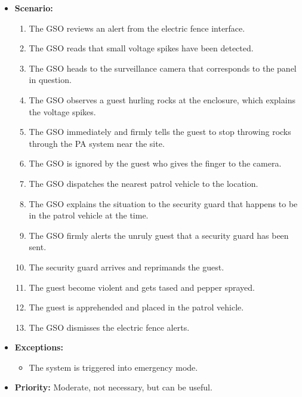 \documentclass[12pt]{article}
\begin{document}
\begin{itemize}
        \item[]\textbf{Scenario:}
            \begin{enumerate}
                \item The GSO reviews an alert from the electric fence interface.
                \item The GSO reads that small voltage spikes have been detected.
                \item The GSO heads to the surveillance camera that corresponds to the
                panel in question.
                \item The GSO observes a guest hurling rocks at the enclosure, which
                explains the voltage spikes.
                \item The GSO immediately and firmly tells the guest to stop throwing rocks
                through the PA system near the site.
                \item The GSO is ignored by the guest who gives the finger to the camera.
                \item The GSO dispatches the nearest patrol vehicle to the location.
                \item The GSO explains the situation to the security guard that happens 
                to be in the patrol vehicle at the time.
                \item The GSO firmly alerts the unruly guest that a security guard has been sent.
                \item The security guard arrives and reprimands the guest.
                \item The guest become violent and gets tased and pepper sprayed.
                \item The guest is apprehended and placed in the patrol vehicle.
                \item The GSO dismisses the electric fence alerts.
            \end{enumerate}

        \item[]\textbf{Exceptions:}
            \begin{itemize}
                \item[] The system is triggered into emergency mode.
            \end{itemize}

        \item[]\textbf{Priority:}
            Moderate, not necessary, but can be useful.
            

\end{itemize}
\end{document}
